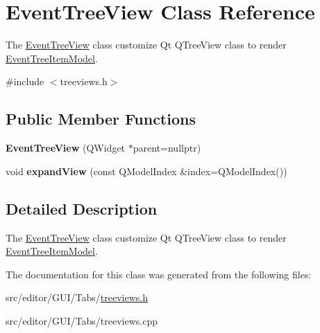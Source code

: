 \hypertarget{class_event_tree_view}{\section{\-Event\-Tree\-View \-Class \-Reference}
\label{class_event_tree_view}
}


\-The \hyperlink{class_event_tree_view}{\-Event\-Tree\-View} class customize \-Qt \-Q\-Tree\-View class to render \hyperlink{class_event_tree_item_model}{\-Event\-Tree\-Item\-Model}.  




{\ttfamily \#include $<$treeviews.\-h$>$}

\subsection*{\-Public \-Member \-Functions}
\begin{DoxyCompactItemize}
\item 
\hypertarget{class_event_tree_view_acc3ec91cad715a8066d664e1267bf9e2}{{\bfseries \-Event\-Tree\-View} (\-Q\-Widget $\ast$parent=nullptr)}\label{class_event_tree_view_acc3ec91cad715a8066d664e1267bf9e2}

\item 
\hypertarget{class_event_tree_view_aecc7018254cfb444283593132db91c43}{void {\bfseries expand\-View} (const \-Q\-Model\-Index \&index=\-Q\-Model\-Index())}\label{class_event_tree_view_aecc7018254cfb444283593132db91c43}

\end{DoxyCompactItemize}


\subsection{\-Detailed \-Description}
\-The \hyperlink{class_event_tree_view}{\-Event\-Tree\-View} class customize \-Qt \-Q\-Tree\-View class to render \hyperlink{class_event_tree_item_model}{\-Event\-Tree\-Item\-Model}. 

\-The documentation for this class was generated from the following files\-:\begin{DoxyCompactItemize}
\item 
src/editor/\-G\-U\-I/\-Tabs/\hyperlink{treeviews_8h}{treeviews.\-h}\item 
src/editor/\-G\-U\-I/\-Tabs/treeviews.\-cpp\end{DoxyCompactItemize}
